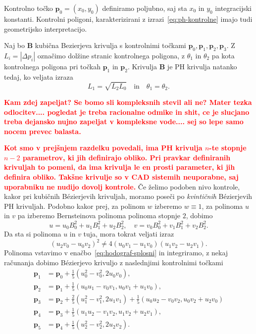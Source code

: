 \documentclass[isrm2, tisk]{fmfdelo}
\newcommand{\p}{\mathbf{p}}
\newcommand{\mycomment}[1]{\textbf{\textcolor{red}{#1}}}
\begin{document}
    Kontrolno točko $\p_0=(x_0,y_0)$ definiramo poljubno, saj sta $x_0$ in $y_0$ integracijski konstanti.
    Kontrolni poligoni, karakterizirani z izrazi~\eqref{eq:ph-kontrolne} imajo tudi geometrijsko interpretacijo.
    \begin{izrek}
        Naj bo $\mathbf{B}$ kubična Bezierjeva krivulja s kontrolnimi točkami $\p_0,\p_1,\p_2,\p_3$.
        Z $L_i=|\Delta p_i|$ označimo dolžine stranic kontrolnega poligona, z $\theta_1$ in $\theta_2$ pa kota kontrolnega poligona pri točkah $\p_1$ in  $\p_2$.
        Krivulja $\mathbf{B}$ je PH krivulja natanko tedaj, ko veljata izraza
        \[L_1=\sqrt{L_2L_0}\quad \text{in} \quad \theta_1=\theta_2 .\]
    \end{izrek}

    \mycomment{ Kam zdej zapeljat? Se bomo sli kompleksnih stevil ali ne? Mater tezka odlocitev.... pogledat je treba racionalne odmike in shit, ce je slucjano treba dejansko nujno zapeljat v kompleksne vode.... sej so lepe samo nocem prevec balasta.}

    \mycomment{Kot smo v prejšnjem razdelku povedali, ima PH krivulja $n$-te stopnje $n-2$ parametrov, ki jih definirajo obliko.
    Pri pravkar definiranih krivuljah to pomeni, da ima krivulja le en prosti parameter, ki jih definira obliko.
    Takšne krivulje so v CAD sistemih neuporabne, saj uporabniku ne nudijo dovolj kontrole.}
    Če želimo podoben nivo kontrole, kakor pri kubičnih Bézierjevih krivuljah, moramo poseči po \textit{kvintičnih} Bézierjevih PH krivuljah.
    Podobno kakor prej, za polinom $w$ izberemo $w\equiv 1$, za polinoma $u$ in $v$ pa izberemo Bernsteinova polinoma polinoma stopnje $2$, dobimo
    \[u=u_0B_{0}^{2}+u_1B_{1}^{2}+u_2B_{2}^{2},\quad v=v_0B_{0}^{2}+v_1B_{1}^{2}+v_2B_{2}^{2}.\]
    Da sta si polinoma $u$ in $v$ tuja, mora tokrat veljati izraz \[(u_2 v_0 -u_0 v_2)^2 \neq 4(u_0 v_1 - u_1 v_0)(u_1 v_2-u_2v_1).\]
    Polinoma vstavimo v enačbo~\eqref{eq:hodograf-splosni} in integriramo, z nekaj računanja dobimo Bézierjevo krivuljo z naslednjimi kontrolnimi točkami
    \begin{align*}
        \p_1 &=\p_0+\frac{1}{5}(u_0^2-v_0^2,2u_0v_0), \\
        \p_2 &= \p_1+\frac{1}{5}(u_0u_1-v_0v_1, u_0v_1+u_1v_0),\\
        \p_3 &= \p_2 + \frac{2}{5}(u_1^2-v_1^2, 2u_1v_1) + \frac{1}{5}(u_0u_2-v_0v_2, u_0v_2+u_2v_0)  \\
        \p_4 &= \p_3+\frac{1}{5}(u_1u_2-v_1v_2, u_1v_2+u_2v_1),\\
        \p_5 &=\p_4+\frac{1}{5}(u_2^2-v_2^2,2u_2v_2).  \label{eq:ph-kontrolne-5}
    \end{align*}
\end{document}
